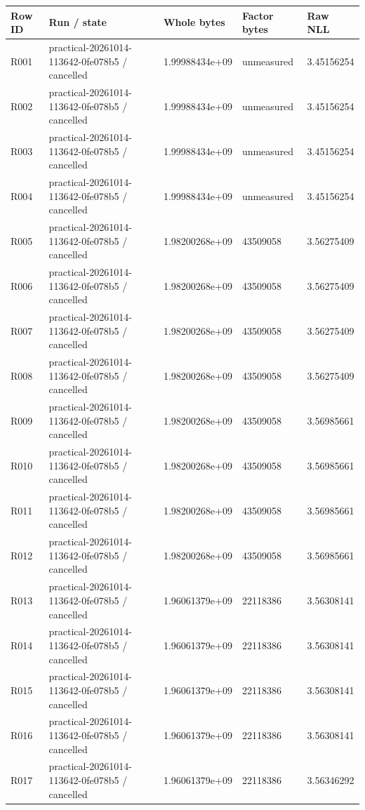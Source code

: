 \documentclass[10pt]{article}
\begin{document}
{\scriptsize\setlength{\tabcolsep}{2pt}
\begin{longtable}{p{}p{}p{}p{}p{}}
Row ID & Run / state & Whole bytes & Factor bytes & Raw NLL \\
\hline\endhead
R001 & practical-20261014-113642-0fe078b5 / cancelled & 1.99988434e+09 & unmeasured & 3.45156254 \\
R002 & practical-20261014-113642-0fe078b5 / cancelled & 1.99988434e+09 & unmeasured & 3.45156254 \\
R003 & practical-20261014-113642-0fe078b5 / cancelled & 1.99988434e+09 & unmeasured & 3.45156254 \\
R004 & practical-20261014-113642-0fe078b5 / cancelled & 1.99988434e+09 & unmeasured & 3.45156254 \\
R005 & practical-20261014-113642-0fe078b5 / cancelled & 1.98200268e+09 & 43509058 & 3.56275409 \\
R006 & practical-20261014-113642-0fe078b5 / cancelled & 1.98200268e+09 & 43509058 & 3.56275409 \\
R007 & practical-20261014-113642-0fe078b5 / cancelled & 1.98200268e+09 & 43509058 & 3.56275409 \\
R008 & practical-20261014-113642-0fe078b5 / cancelled & 1.98200268e+09 & 43509058 & 3.56275409 \\
R009 & practical-20261014-113642-0fe078b5 / cancelled & 1.98200268e+09 & 43509058 & 3.56985661 \\
R010 & practical-20261014-113642-0fe078b5 / cancelled & 1.98200268e+09 & 43509058 & 3.56985661 \\
R011 & practical-20261014-113642-0fe078b5 / cancelled & 1.98200268e+09 & 43509058 & 3.56985661 \\
R012 & practical-20261014-113642-0fe078b5 / cancelled & 1.98200268e+09 & 43509058 & 3.56985661 \\
R013 & practical-20261014-113642-0fe078b5 / cancelled & 1.96061379e+09 & 22118386 & 3.56308141 \\
R014 & practical-20261014-113642-0fe078b5 / cancelled & 1.96061379e+09 & 22118386 & 3.56308141 \\
R015 & practical-20261014-113642-0fe078b5 / cancelled & 1.96061379e+09 & 22118386 & 3.56308141 \\
R016 & practical-20261014-113642-0fe078b5 / cancelled & 1.96061379e+09 & 22118386 & 3.56308141 \\
R017 & practical-20261014-113642-0fe078b5 / cancelled & 1.96061379e+09 & 22118386 & 3.56346292 \\

\end{longtable}}
\end{document}

